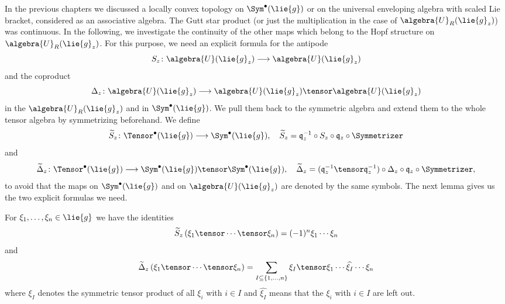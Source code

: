 In the previous chapters we discussed a locally convex topology on $\Sym^{\bullet}
(\lie{g})$ or on the universal enveloping algebra with scaled Lie bracket, 
considered as an associative algebra. The Gutt star product (or just the 
multiplication in the case of $\algebra{U}_R(\lie{g}_z)$) was continuous.
In the following, we investigate the continuity of the other maps which belong to 
the Hopf structure on $\algebra{U}_R(\lie{g}_z)$. For this purpose, we need an 
explicit formula for the antipode
\begin{equation}
    \label{eq:Antipode}
    S_z \colon
    \algebra{U}(\lie{g}_z)
    \longrightarrow
    \algebra{U}(\lie{g}_z)
\end{equation}
and the coproduct
\begin{equation}
    \label{eq:CoProduct}
    \coproduct_z \colon
    \algebra{U}(\lie{g}_z)
    \longrightarrow
    \algebra{U}(\lie{g}_z)
    \tensor
    \algebra{U}(\lie{g}_z)
\end{equation}
in the $\algebra{U}_R(\lie{g}_z)$ and in $\Sym^{\bullet}(\lie{g})$. We pull them 
back to the symmetric algebra and extend them to the whole tensor algebra by 
symmetrizing beforehand. We define
\begin{equation}
    \label{eq:AntipodeOnTensor}
    \widetilde{S}_z \colon
    \Tensor^\bullet(\lie{g})
    \longrightarrow
    \Sym^\bullet(\lie{g})
    , \quad
    \widetilde{S}_z
    =
    \mathfrak{q}_z^{-1}
    \circ
    S_z
    \circ
    \mathfrak{q}_z
    \circ
    \Symmetrizer
\end{equation}
and
\begin{equation}
    \label{eq:CoProductOnTensor}
    \widetilde{\ocoproduct}_z \colon
    \Tensor^\bullet(\lie{g})
    \longrightarrow
    \Sym^\bullet(\lie{g})
    \tensor
    \Sym^\bullet(\lie{g})
    , \quad
    \widetilde{\ocoproduct}_z
    =
    (\mathfrak{q}_z^{-1} \tensor \mathfrak{q}_z^{-1})
    \circ
    \coproduct_z
    \circ
    \mathfrak{q}_z
    \circ
    \Symmetrizer,
\end{equation}
to avoid that the maps on $\Sym^{\bullet}(\lie{g})$ and on $\algebra{U}
(\lie{g}_z)$ are denoted by the same symbols. The next lemma gives us the two 
explicit formulas we need.
\begin{lemma}
    \label{Thm:Hopf:Formulas}%
    For $\xi_1, \ldots, \xi_n \in \lie{g}$ we have the identities
    \begin{equation}
        \label{Hopf:AntipodeFormula}
        \widetilde{S}_z
        \left( \xi_1 \tensor \cdots \tensor \xi_n \right)
        =
        (-1)^n
        \xi_1 \cdots \xi_n
    \end{equation}
    and
    \begin{equation}
        \label{Hopf:CoproductFormula}
        \widetilde{\ocoproduct}_z
        \left(\xi_1 \tensor \cdots \tensor \xi_n \right)
        =
        \sum\limits_{
        	I \subseteq
        	\{1, \ldots, n\}
        }
        \xi_I
        \tensor
        \xi_1 \cdots
        \widehat{\xi_I}
        \cdots \xi_n
    \end{equation}
    where $\xi_I$ denotes the symmetric tensor product of all $\xi_i$ with 
    $i \in I$ and $\widehat{\xi_I}$ means that the $\xi_i$ with $i \in I$ 
    are left out.
\end{lemma}

